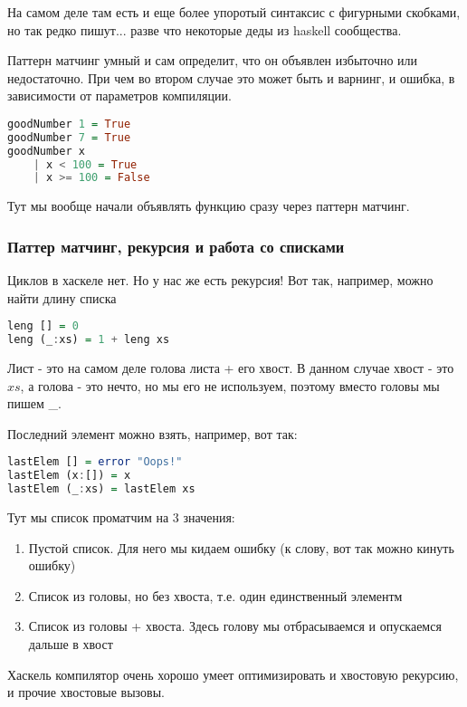 \documentclass[10pt, a4paper]{article}
\begin{document}
На самом деле там есть и еще более упоротый синтаксис с фигурными скобками, но так редко пишут... разве что некоторые деды из haskell сообщества.

Паттерн матчинг умный и сам определит, что он объявлен избыточно или недостаточно. При чем во втором случае это может быть и варнинг, и ошибка, в зависимости от параметров компиляции.

\begin{lstlisting}[language=haskell]
goodNumber 1 = True
goodNumber 7 = True
goodNumber x 
    | x < 100 = True
    | x >= 100 = False 
\end{lstlisting}

Тут мы вообще начали объявлять функцию сразу через паттерн матчинг.

\subsubsection{Паттер матчинг, рекурсия и работа со списками}
Циклов в хаскеле нет. Но у нас же есть рекурсия! Вот так, например, можно найти длину списка
\begin{lstlisting}[language=haskell]
leng [] = 0
leng (_:xs) = 1 + leng xs 
\end{lstlisting}

Лист - это на самом деле голова листа + его хвост. В данном случае хвост - это $xs$, а голова - это нечто, но мы его не используем, поэтому вместо головы мы пишем \_.

Последний элемент можно взять, например, вот так:
\begin{lstlisting}[language=haskell]
lastElem [] = error "Oops!"
lastElem (x:[]) = x
lastElem (_:xs) = lastElem xs
\end{lstlisting}

Тут мы список проматчим на 3 значения:
\begin{enumerate}
	\item Пустой список. Для него мы кидаем ошибку (к слову, вот так можно кинуть ошибку)
	\item Список из головы, но без хвоста, т.е. один единственный элементм
	\item Список из головы + хвоста. Здесь голову мы отбрасываемся и опускаемся дальше в хвост
\end{enumerate}

Хаскель компилятор очень хорошо умеет оптимизировать и хвостовую рекурсию, и прочие хвостовые вызовы.

\end{document}
